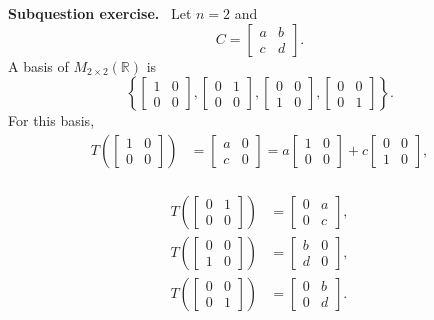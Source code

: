 \documentclass[letterpaper]{article}
\newcommand{\noteheader}[1]{\par\medskip\noindent\textbf{#1}\ }
\begin{document}
\medskip

\noteheader{Subquestion exercise.} Let $n=2$ and
\[
C=\begin{bmatrix}a&b\\c&d\end{bmatrix}.
\]
A basis of $M_{2\times2}(\mathbb{R})$ is
\[
\left\{
\begin{bmatrix}1&0\\0&0\end{bmatrix},
\begin{bmatrix}0&1\\0&0\end{bmatrix},
\begin{bmatrix}0&0\\1&0\end{bmatrix},
\begin{bmatrix}0&0\\0&1\end{bmatrix}
\right\}.
\]
For this basis,
\begin{align*}
T\left(\begin{bmatrix}1&0\\0&0\end{bmatrix}\right)
&=\begin{bmatrix}a&0\\c&0\end{bmatrix}
=a\begin{bmatrix}1&0\\0&0\end{bmatrix}
+c\begin{bmatrix}0&0\\1&0\end{bmatrix},\\
\end{align*}

\clearpage

\begin{align*}
T\left(\begin{bmatrix}0&1\\0&0\end{bmatrix}\right)
&=\begin{bmatrix}0&a\\0&c\end{bmatrix},\\
T\left(\begin{bmatrix}0&0\\1&0\end{bmatrix}\right)
&=\begin{bmatrix}b&0\\d&0\end{bmatrix},\\
T\left(\begin{bmatrix}0&0\\0&1\end{bmatrix}\right)
&=\begin{bmatrix}0&b\\0&d\end{bmatrix}.
\end{align*}
\end{document}
